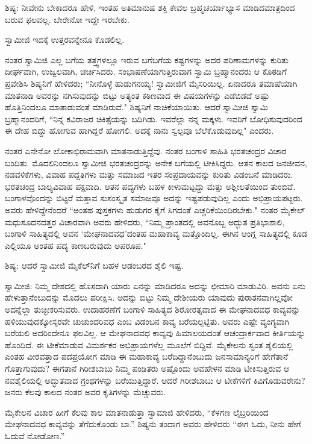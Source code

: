 ಶಿಷ್ಯ: ನೀವೇನು ಬೇಕಾದರೂ ಹೇಳಿ, ಇಂತಹ ಅತಿಮಾನುಷ ಶಕ್ತಿ ಕೇವಲ ಬ್ರಹ್ಮಚರ್ಯಾಭ್ಯಾಸ ಮಾಡಿದಮಾತ್ರದಿಂದ ಬರುವ ಫಲವಲ್ಲ. ಬೇರೇನೋ ಇದ್ದೇ ಇರಬೇಕು.

ಸ್ವಾಮೀಜಿ ಇದಕ್ಕೆ ಉತ್ತರವನ್ನೇನೂ ಕೊಡಲಿಲ್ಲ.

ನಂತರ ಸ್ವಾಮಿಜಿ ಎಲ್ಲ ಬಗೆಯ ತತ್ತ್ವಗಳಲ್ಲೂ ಇರುವ ಬಗೆಬಗೆಯ ಕಷ್ಟಗಳನ್ನು ಅದರ ಪರಿಣಾಮಗಳನ್ನು ಕುರಿತು ದೀರ್ಘವಾಗಿ, ಉಜ್ವಲವಾಗಿ, ಚರ್ಚಿಸಿದರು. ಸಂಭಾಷಣೆಯಾಗುತ್ತಿರುವಾಗ ಸ್ವಾಮಿ ಬ್ರಹ್ಮಾನಂದರು ಆ ಕೊಠಡಿಗೆ ಪ್ರವೇಶಿಸಿ ಶಿಷ್ಯನಿಗೆ ಹೇಳಿದರು; “ನೀನೊಳ್ಳೆ ಹುಡುಗನಯ್ಯ! ಸ್ವಾಮೀಜಿಗೆ ಮೈಸರಿಯಿಲ್ಲ. ಏನಾದರೂ ತಮಾಷೆಯಾಗಿ ಮಾತನಾಡಿ ಅವರನ್ನು ನಗಿಸುವುದನ್ನು ಬಿಟ್ಟು ಅತ್ಯಂತ ಕಠಿಣವಾದ ಈ ವಿಷಯಗಳನ್ನು ಎಡೆಬಿಡದೆ ಅಷ್ಟು ಹೊತ್ತಿನಿಂದಲೂ ಮಾತಾಡುವಂತೆ ಮಾಡಿರುವೆ." ಶಿಷ್ಯನಿಗೆ ನಾಚಿಕೆಯಾಯಿತು. ಆದರೆ ಸ್ವಾಮೀಜಿ ಸ್ವಾಮಿ ಬ್ರಹ್ಮಾನಂದರಿಗೆ, “ನಿನ್ನ ಕವಿರಾಜರ ಚಿಕಿತ್ಸೆಯನ್ನು ಬದಿಗಿಡು. ಇವರೆಲ್ಲಾ ನನ್ನ ಮಕ್ಕಳು. ಇವರಿಗೆ ಬೋಧಿಸುವುದರಿಂದ ಈ ದೇಹ ಬಿದ್ದು ಹೋಗುವ ಹಾಗಿದ್ದರೆ ಹೋಗಲಿ. ಅದಕ್ಕೆ ನಾನು ಸ್ವಲ್ಪವೂ ಬೆಲೆಕೊಡುವುದಿಲ್ಲ" ಎಂದರು.

ನಂತರ ಏನೇನೋ ಲೋಕಾಭಿರಾಮವಾಗಿ ಮಾತನಾಡುತ್ತಿದ್ದೆವು. ನಂತರ ಬಂಗಾಳಿ ಸಾಹಿತಿ ಭರತಚಂದ್ರರ ವಿಚಾರ ಬಂದಿತು. ಮೊದಲಿನಿಂದಲೂ ಸ್ವಾಮೀಜಿ ಭರತಚಂದ್ರರನ್ನು ಅನೇಕ ಬಗೆಯಲ್ಲಿ ಟೀಕಿಸಿದ್ದರು. ಆತನ ಕಾಲದ ಜನಜೀವನ, ನಡವಳಿಕೆಗಳು, ವಿವಾಹ ಪದ್ದತಿಗಳು ಮತ್ತು ಸಮಾಜದ ಇತರ ಸಂಪ್ರದಾಯವನ್ನು ಕುರಿತು ವಿಡಂಬನೆ ಮಾಡಿದರು. ಭರತಚಂದ್ರ ಬಾಲ್ಯವಿವಾಹ ಪಕ್ಷವಾದಿ. ಆತನ ಪದ್ಯಗಳು ಬಹಳ ಕೀಳುಮಟ್ಟದ್ದು ಮತ್ತು ಅಶ್ಲೀಲತೆಯಿಂದ ತುಂಬಿವೆ. ಬಂಗಾಳವೊಂದನ್ನು ಬಿಟ್ಟರೆ ಮತ್ತಾವ ಸುಸಂಸ್ಕೃತ ಸಮಾಜವೂ ಅದನ್ನು ಇಷ್ಟಪಡುವುದಿಲ್ಲ ಎಂದು ಅಭಿಪ್ರಾಯಪಟ್ಟರು. ಅವರು ಹೇಳಿದ್ದೇನೆಂದರೆ “ಅಂತಹ ಪುಸ್ತಕಗಳು ಹುಡುಗರ ಕೈಗೆ ಸಿಗದಂತೆ ಎಚ್ಚರಿಕೆಯಿಂದಿರಬೇಕು." ನಂತರ ಮೈಕೇಲ್ ಮಧುಸೂದನದತ್ತರ ವಿಚಾರವಾಗಿ ಅವರು ಹೇಳಿದರು, “ನಿಮ್ಮ ಪ್ರಾಂತದಲ್ಲಿ ಅವನೊಬ್ಬ ಅದ್ಭುತ ಪ್ರತಿಭಾಶಾಲಿ, ಬಂಗಾಳಿ ಸಾಹಿತ್ಯದಲ್ಲಿ ಅವನ ‘ಮೇಘನಾದವಧ’ದಂತಹ ಮಹಾಕಾವ್ಯ ಮತ್ತೊಂದಿಲ್ಲ. ಈಗಿನ ಆಂಗ್ಲ ಸಾಹಿತ್ಯದಲ್ಲಿ ಕೂಡ ಎಲ್ಲಿಯೂ ಅಂತಹ ಪದ್ಯ ಕಾಣಬರುವುದು ಅಪರೂಪ."

ಶಿಷ್ಯ: ಆದರೆ ಸ್ವಾಮೀಜಿ ಮೈಕೆಲ್‌ನಿಗೆ ಬಹಳ ಆಡಂಬರದ ಶೈಲಿ ಇಷ್ಟ.

ಸ್ವಾಮೀಜಿ: ನಿಮ್ಮ ದೇಶದಲ್ಲಿ ಹೊಸದಾಗಿ ಯಾರು ಏನನ್ನು ಮಾಡಿದರೂ ಅದನ್ನು ಛೀಮಾರಿ ಮಾಡುವಿರಿ. ಅವನು ಏನು ಹೇಳುತ್ತಾನೆಂಬುದನ್ನು ಮೊದಲು ಪರೀಕ್ಷಿಸಿ. ಅದನ್ನು ಬಿಟ್ಟು ನಿಮ್ಮ ದೇಶೀಯರು ಯಾವುದು ಪುರಾತನವಾಗಿಲ್ಲವೋ ಅದನ್ನೆಲ್ಲಾ ತುಚ್ಛೀಕರಿಸುವರು. ಉದಾಹರಣೆಗೆ ಬಂಗಾಳಿ ಸಾಹಿತ್ಯದ ಶಿರೋರತ್ನವಾದ ಈ ಮೇಘನಾದವಧ ಕಾವ್ಯವನ್ನು ಹಳಿಯುವುದಕ್ಕೋಸ್ಕರವೇ ಚುಚುಂದರಿವಧ ಎಂಬ ವಿಡಂಬನ ಕಾವ್ಯ ಬರೆಯಲ್ಪಟ್ಟಿತು. ಅವರು ಎಷ್ಟೇ ವ್ಯಂಗ್ಯವಾಗಿ ಬರೆಯಲಿ ಅದರಿಂದೇನೂ ಫಲವಿಲ್ಲ. ಆ ಮೇಘನಾದವಧ ಕಾವ್ಯವು ಹಿಮಾಲಯದಂತೆ ಆಚಂದ್ರಾರ್ಕವಾದ ಕೀರ್ತಿಯನ್ನು ಹೊಂದಿದೆ. ಈ ಟೀಕೆಮಾಡುವ ವಿಮರ್ಶಕರ ಅಭಿಪ್ರಾಯಗಳೆಲ್ಲ ಮೂಲೆಗೆ ಬಿದ್ದಿವೆ. ಮೈಕೇಲನು ಸ್ವಂತ ಶೈಲಿಯಲ್ಲಿ ಎಂತಹ ವೀರವತ್ತಾದ ಪದಪ್ರಯೋಗ ಮಾಡಿ ಈ ಮಹಾಕಾವ್ಯ ಬರೆದಿದ್ದಾನೆಂಬುದು ಜನಸಾಮಾನ್ಯರಿಗೆ ಹೇಗೆತಾನೆ ಗೊತ್ತಾಗುವುದು? ಈಗತಾನೆ ಗಿರೀಶಬಾಬು ನಿಮ್ಮ ಪಂಡಿತರು ಅಷ್ಟೊಂದು ಅವಹೇಳನ ಮಾಡಿ ಟೀಕಿಸುತ್ತಿರುವ ಆ ನವಶೈಲಿಯಲ್ಲಿ ಅದ್ಭುತವಾದ ಗ್ರಂಥಗಳನ್ನು ಬರೆಯುತ್ತಿದ್ದಾರೆ. ಆದರೆ ಗಿರೀಶಬಾಬು ಆ ಟೀಕೆಗಳಿಗೆ ಕಿವಿಗೊಡುವರೇನು? ಜನರು ಕೆಲವು ಕಾಲದ ನಂತರ ಅವರ ಕೃತಿಗಳನ್ನು ಮೆಚ್ಚುವರು.

ಮೈಕೇಲನ ವಿಚಾರ ಹೀಗೆ ಕೆಲವು ಕಾಲ ಮಾತನಾಡುತ್ತಾ ಸ್ವಾಮಾಜಿ ಹೇಳಿದರು, “ಕೆಳಗಣ ಲೈಬ್ರರಿಯಿಂದ ಮೇಘನಾದವಧ ಕಾವ್ಯವನ್ನು ತೆಗೆದುಕೊಂಡು ಬಾ.” ಶಿಷ್ಯನು ತಂದಾಗ ಅವರು ಹೇಳಿದರು “ಈಗ ಓದು, ನೀನು ಹೇಗೆ ಓದುವೆ ನೋಡೋಣ.”

